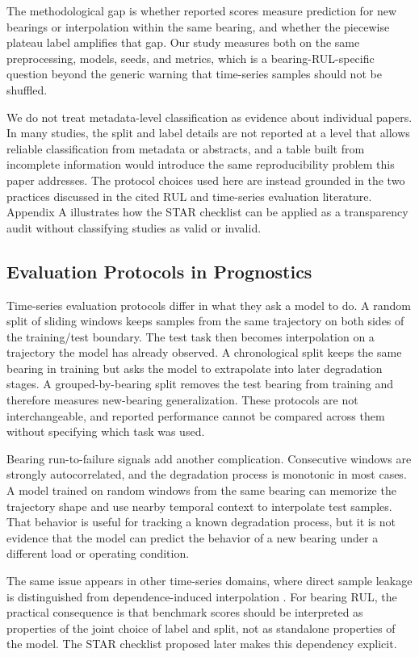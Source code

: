 \documentclass[pdflatex,sn-mathphys-num]{sn-jnl}
\begin{document}
The methodological gap is whether reported scores measure prediction for new bearings or interpolation within the same bearing, and whether the piecewise plateau label amplifies that gap. Our study measures both on the same preprocessing, models, seeds, and metrics, which is a bearing-RUL-specific question beyond the generic warning that time-series samples should not be shuffled.

We do not treat metadata-level classification as evidence about individual papers. In many studies, the split and label details are not reported at a level that allows reliable classification from metadata or abstracts, and a table built from incomplete information would introduce the same reproducibility problem this paper addresses. The protocol choices used here are instead grounded in the two practices discussed in the cited RUL and time-series evaluation literature. Appendix A illustrates how the STAR checklist can be applied as a transparency audit without classifying studies as valid or invalid.

\subsection{Evaluation Protocols in Prognostics}
Time-series evaluation protocols differ in what they ask a model to do. A random split of sliding windows keeps samples from the same trajectory on both sides of the training/test boundary. The test task then becomes interpolation on a trajectory the model has already observed. A chronological split keeps the same bearing in training but asks the model to extrapolate into later degradation stages. A grouped-by-bearing split removes the test bearing from training and therefore measures new-bearing generalization. These protocols are not interchangeable, and reported performance cannot be compared across them without specifying which task was used.

Bearing run-to-failure signals add another complication. Consecutive windows are strongly autocorrelated, and the degradation process is monotonic in most cases. A model trained on random windows from the same bearing can memorize the trajectory shape and use nearby temporal context to interpolate test samples. That behavior is useful for tracking a known degradation process, but it is not evidence that the model can predict the behavior of a new bearing under a different load or operating condition.

The same issue appears in other time-series domains, where direct sample leakage is distinguished from dependence-induced interpolation \cite{leakage_nature,leakage_frontiers}. For bearing RUL, the practical consequence is that benchmark scores should be interpreted as properties of the joint choice of label and split, not as standalone properties of the model. The STAR checklist proposed later makes this dependency explicit.
\end{document}

